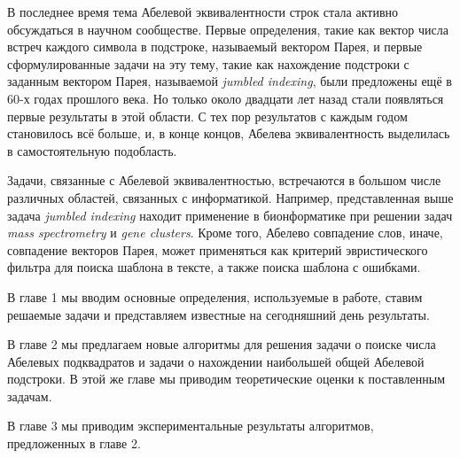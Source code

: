 
В последнее время тема Абелевой эквивалентности строк стала активно обсуждаться в научном сообществе.
Первые определения, такие как вектор числа встреч каждого символа в подстроке, называемый вектором Парея,
и первые сформулированные задачи на эту тему, такие как нахождение подстроки
с заданным вектором Парея, называемой \textit{jumbled indexing}, были предложены ещё в 60-х годах прошлого века.
Но только около двадцати лет назад стали появляться первые результаты в этой области.
С тех пор результатов с каждым годом становилось всё больше, и, в конце концов, Абелева эквивалентность выделилась в
самостоятельную подобласть.

Задачи, связанные с Абелевой эквивалентностью, встречаются в большом числе различных областей, связанных с информатикой.
Например, представленная выше задача \textit{jumbled indexing} находит применение в бионформатике
при решении задач \textit{mass spectrometry} и \textit{gene clusters}.
Кроме того, Абелево совпадение слов, иначе, совпадение векторов Парея,
может применяться как критерий эвристического фильтра для поиска шаблона в тексте,
а также поиска шаблона с ошибками.

В главе 1 мы вводим основные определения, используемые в работе, ставим решаемые задачи и представляем
известные на сегодняшний день результаты.

В главе 2 мы предлагаем новые алгоритмы для решения задачи о поиске числа Абелевых подквадратов
и задачи о нахождении наибольшей общей Абелевой подстроки.
В этой же главе мы приводим теоретические оценки к поставленным задачам.

В главе 3 мы приводим экспериментальные результаты алгоритмов, предложенных в главе 2.

